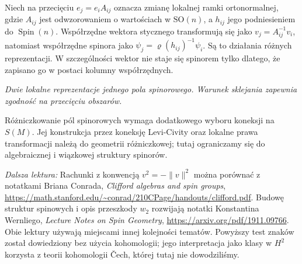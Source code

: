 \begin{uwaga}
\label{rem:lin31-pola-spinorowe-ramki}
Niech na przecięciu $e_j=e_i A_{ij}$ oznacza zmianę
lokalnej ramki ortonormalnej, gdzie $A_{ij}$ jest
odwzorowaniem o wartościach w $\mathrm{SO}(n)$,
a $h_{ij}$ jego podniesieniem do $\operatorname{Spin}(n)$.
Współrzędne wektora stycznego transformują się jako
$v_j=A_{ij}^{-1}v_i$, natomiast współrzędne spinora
jako $\psi_j=\varrho(h_{ij})^{-1}\psi_i$.
Są to działania różnych reprezentacji. W szczególności
wektor nie staje się spinorem tylko dlatego, że zapisano go
w postaci kolumny współrzędnych.
\end{uwaga}

\begin{center}

{\small\itshape Dwie lokalne reprezentacje jednego pola spinorowego.
Warunek sklejania zapewnia zgodność na przecięciu obszarów.}
\end{center}

Różniczkowanie pól spinorowych wymaga dodatkowego
wyboru koneksji na $S(M)$. Jej konstrukcja przez
koneksję Levi-Civity oraz lokalne prawa transformacji
należą do geometrii różniczkowej; tutaj ograniczamy się
do algebraicznej i wiązkowej struktury spinorów.


\par\smallskip
{\footnotesize\noindent\emph{Dalsza lektura:}
Rachunki z konwencją $v^2=-\|v\|^2$
można porównać z notatkami Briana Conrada,
\emph{Clifford algebras and spin groups},
\url{https://math.stanford.edu/~conrad/210CPage/handouts/clifford.pdf}.
Budowę struktur spinowych i opis przeszkody
$w_2$ rozwijają notatki Konstantina Wernliego,
\emph{Lecture Notes on Spin Geometry},
\url{https://arxiv.org/pdf/1911.09766}.
Obie lektury używają miejscami innej kolejności tematów.
Powyższy test znaków został dowiedziony bez użycia kohomologii;
jego interpretacja jako klasy w $H^2$ korzysta z teorii
kohomologii Čech, której tutaj nie dowodziliśmy.\par}
\clearpage
